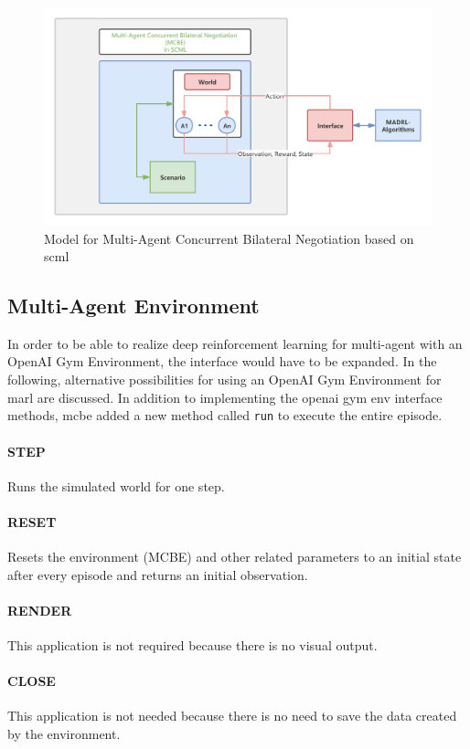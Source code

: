 \begin{figure}[htbp]
\centering
\includegraphics[width=1.0\textwidth]{./images/MCBE.png}
\caption{Model for Multi-Agent Concurrent Bilateral Negotiation based on \gls{scml}}
\label{fig:environment-multi-agent}
\end{figure}

\subsection{Multi-Agent Environment} \label{multi-agent-env}
In order to be able to realize deep reinforcement learning for multi-agent with an OpenAI Gym Environment, the interface would have to be expanded. In the following, alternative possibilities for using an OpenAI Gym Environment for \gls{marl} are discussed. 
In addition to implementing the \gls{openai gym} env interface methods, \gls{mcbe} added a new method called \texttt{run} to execute the entire episode.
\paragraph{STEP} Runs the simulated world for one step.
\paragraph{RESET} Resets the environment (MCBE) and other related parameters to an initial state after every episode and returns an initial observation.
\paragraph{RENDER} This application is not required because there is no visual output.
\paragraph{CLOSE} This application is not needed because there is no need to save the data created by
the environment.

